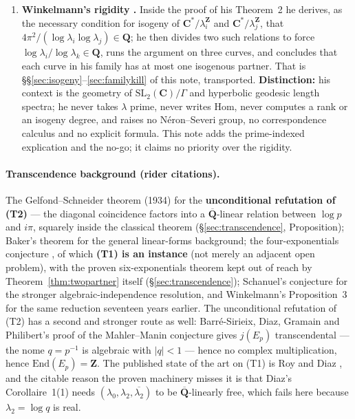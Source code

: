 \documentclass[11pt]{article}
\theoremstyle{definition}
\theoremstyle{remark}
\newcommand{\Z}{\mathbf{Z}}
\newcommand{\Q}{\mathbf{Q}}
\newcommand{\C}{\mathbf{C}}
\newcommand{\Hom}{\mathrm{Hom}}
\newcommand{\End}{\mathrm{End}}
\begin{document}
\begin{enumerate}
per-prime-to-archimedean bridge, not a cross-prime one.
\textbf{Distinction:} disjoint mechanism; cited for completeness of the
search record.
\item \textbf{Winkelmann's rigidity \cite{Wi04}.} Inside the proof of his
Theorem~2 he derives, as the necessary condition for isogeny of
$\C^*/\lambda_i^{\Z}$ and $\C^*/\lambda_j^{\Z}$, that
$4\pi^2/(\log\lambda_i\log\lambda_j) \in \Q$; he then divides two such
relations to force
$\log\lambda_i/\log\lambda_k \in \Q$, runs the argument on three curves, and
concludes that each curve in his family has at most one isogenous partner. That
is \S\S\ref{sec:isogeny}--\ref{sec:familykill} of this note, transported.
\textbf{Distinction:} his context is the geometry of $\mathrm{SL}_2(\C)/\Gamma$
and hyperbolic geodesic length spectra; he never takes $\lambda$ prime, never
writes $\Hom$, never computes a rank or an isogeny degree, and raises no
N\'eron--Severi group, no correspondence calculus and no explicit formula. This
note adds the prime-indexed explication and the no-go; it claims no priority over
the rigidity.
\end{enumerate}

\paragraph{Transcendence background (rider citations).}
The Gelfond--Schneider theorem (1934) for the \textbf{unconditional
refutation of (T2)} --- the diagonal coincidence factors into a
$\overline{\Q}$-linear relation between $\log p$ and $i\pi$, squarely inside
the classical theorem (\S\ref{sec:transcendence}, Proposition); Baker's
theorem for the general linear-forms background; the four-exponentials
conjecture \cite{FourExp}, of which \textbf{(T1) is an instance} (not merely
an adjacent open problem), with the proven six-exponentials theorem kept out
of reach by Theorem~\ref{thm:twopartner} itself
(\S\ref{sec:transcendence}); Schanuel's conjecture for the stronger
algebraic-independence resolution, and Winkelmann's Proposition~3
\cite[\S3.2]{Wi04} for the same reduction seventeen years earlier. The
unconditional refutation of (T2) has a second and stronger route as well:
Barr\'e-Sirieix, Diaz, Gramain and Philibert's proof of the Mahler--Manin
conjecture \cite{BDGP96} gives $j(E_p)$ transcendental --- the nome
$q = p^{-1}$ is algebraic with $|q| < 1$ --- hence no complex multiplication,
hence $\End(E_p) = \Z$. The published state of the art on (T1) is Roy
\cite{Roy92} and Diaz \cite{Dia07}, and the citable reason the proven machinery
misses it is that Diaz's Corollaire~1(1) needs
$(\lambda_0, \lambda_2, \overline{\lambda_2})$ to be $\overline{\Q}$-linearly
free, which fails here because $\lambda_2 = \log q$ is real.
\end{document}
